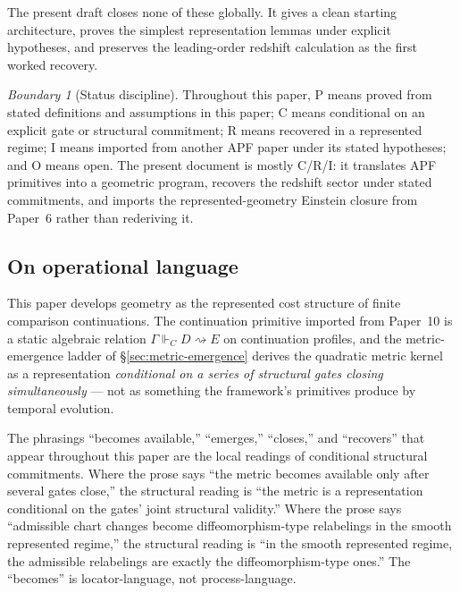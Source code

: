 \documentclass[11pt]{article}
\theoremstyle{remark}
\newtheorem{warning}[theorem]{Boundary}
\newcommand{\G}{\Gamma}
\newcommand{\entails}{\Vdash}
\newcommand{\goes}{\rightsquigarrow}
\newcommand{\Status}[1]{\textsf{#1}}
\begin{document}
The present draft closes none of these globally.  It gives a clean starting architecture, proves the simplest representation lemmas under explicit hypotheses, and preserves the leading-order redshift calculation as the first worked recovery.

\begin{warning}[Status discipline]
Throughout this paper, \Status{P} means proved from stated definitions and assumptions in this paper; \Status{C} means conditional on an explicit gate or structural commitment; \Status{R} means recovered in a represented regime; \Status{I} means imported from another APF paper under its stated hypotheses; and \Status{O} means open.  The present document is mostly \Status{C/R/I}: it translates APF primitives into a geometric program, recovers the redshift sector under stated commitments, and imports the represented-geometry Einstein closure from Paper~6 rather than rederiving it.
\end{warning}

\subsection*{On operational language}

This paper develops geometry as the represented cost structure of finite comparison continuations.  The continuation primitive imported from Paper~10 is a static algebraic relation $\G\entails_C D\goes E$ on continuation profiles, and the metric-emergence ladder of \S\ref{sec:metric-emergence} derives the quadratic metric kernel as a representation \emph{conditional on a series of structural gates closing simultaneously} --- not as something the framework's primitives produce by temporal evolution.

The phrasings ``becomes available,'' ``emerges,'' ``closes,'' and ``recovers'' that appear throughout this paper are the local readings of conditional structural commitments.  Where the prose says ``the metric becomes available only after several gates close,'' the structural reading is ``the metric is a representation conditional on the gates' joint structural validity.''  Where the prose says ``admissible chart changes become diffeomorphism-type relabelings in the smooth represented regime,'' the structural reading is ``in the smooth represented regime, the admissible relabelings are exactly the diffeomorphism-type ones.''  The ``becomes'' is locator-language, not process-language.
\end{document}
